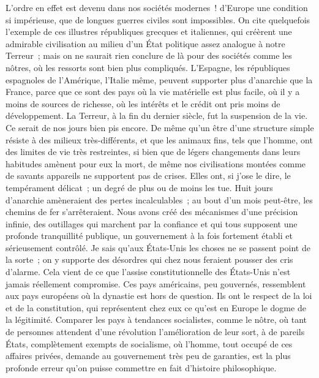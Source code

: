 \documentclass[french,twoside]{book} %
\begin{document}
L’ordre en effet est devenu dans nos sociétés modernes ! d’Europe une condition si impérieuse, que de longues guerres civiles sont impossibles. On cite quelquefois l’exemple de ces illustres républiques grecques et italiennes, qui créèrent une admirable civilisation au milieu d’un État politique assez analogue à notre Terreur ; mais on ne saurait rien conclure de là pour des sociétés comme les nôtres, où les ressorts sont bien plus compliqués. L’Espagne, les républiques espagnoles de l’Amérique, l’Italie même, peuvent supporter plus d’anarchie que la France, parce que ce sont des pays où la vie matérielle est plus facile, où il y a moins de sources de richesse, où les intérêts et le crédit ont pris moins de développement. La Terreur, à la fin du dernier siècle, fut la suspension de la vie. Ce serait de nos jours bien pis encore. De même qu’un être d’une structure simple résiste à des milieux très-différents, et que les animaux fins, tels que l’homme, ont des limites de vie très restreintes, si bien que de légers changements dans leurs habitudes amènent pour eux la mort, de même nos civilisations montées comme de savants appareils ne supportent pas de crises. Elles ont, si j’ose le dire, le tempérament délicat ; un degré de plus ou de moins les tue. Huit jours d’anarchie amèneraient des pertes incalculables ; au bout d’un mois peut-être, les chemins de fer s’arrêteraient. Nous avons créé des mécanismes d’une précision infinie, des outillages qui marchent par la confiance et qui tous supposent une profonde tranquillité publique, un gouvernement à la fois fortement établi et sérieusement contrôlé. Je sais qu’aux États-Unis les choses ne se passent point de la sorte ; on y supporte des désordres qui chez nous feraient pousser des cris d’alarme. Cela vient de ce que l’assise constitutionnelle des États-Unis n’est jamais réellement compromise. Ces pays américains, peu gouvernés, ressemblent aux pays européens où la dynastie est hors de question. Ils ont le respect de la loi et de la constitution, qui représentent chez eux ce qu’est en Europe le dogme de la légitimité. Comparer les pays à tendances socialistes, comme le nôtre, où tant de personnes attendent d’une révolution l’amélioration de leur sort, à de pareils États, complètement exempts de socialisme, où l’homme, tout occupé de ces affaires privées, demande au gouvernement très peu de garanties, est la plus profonde erreur qu’on puisse commettre en fait d’histoire philosophique.\par
\end{document}
